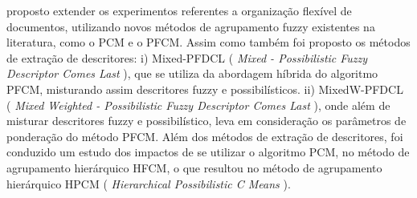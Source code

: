 proposto extender os experimentos referentes a organização flexível de documentos, utilizando
novos métodos de agrupamento fuzzy existentes na literatura, como o PCM e o PFCM. Assim como também 
foi proposto os métodos de extração de descritores: i) Mixed-PFDCL 
({ \it Mixed - Possibilistic Fuzzy Descriptor Comes Last\/ }), que se utiliza da abordagem híbrida do 
algoritmo PFCM, misturando assim descritores fuzzy e possibilísticos. ii) MixedW-PFDCL
({ \it Mixed Weighted - Possibilistic Fuzzy Descriptor Comes Last\/ }), 
onde além de misturar descritores 
fuzzy e possibilístico, leva em consideração os parâmetros de ponderação do método PFCM.
Além dos métodos de extração de descritores, foi conduzido um estudo dos impactos de se utilizar o 
algoritmo PCM, no método de agrupamento hierárquico HFCM, o que resultou no método de 
agrupamento hierárquico HPCM ({ \it Hierarchical Possibilistic C Means\/ }).

